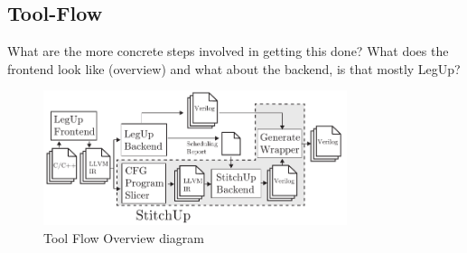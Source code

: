 \subsection{Tool-Flow}
What are the more concrete steps involved in getting this done?
What does the frontend look like (overview) and what about the backend,
is that mostly LegUp?

\begin{figure}[!t]
\centering
\includegraphics[width=3.5in]{./imgs/tool-flow.pdf}
\caption{Tool Flow Overview diagram}
\label{fig:tool_flow_diagram}
\end{figure}



